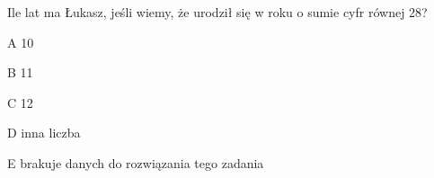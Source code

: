 \begin{tresc}
Ile lat ma Łukasz, jeśli wiemy, że urodził się w roku o sumie cyfr równej 28?
\end{tresc}
\begin{wariant}{A} 10 \end{wariant}
\begin{wariant}{B} 11 \end{wariant}
\begin{wariant}{C} 12 \end{wariant}
\begin{wariant}{D} inna liczba \end{wariant}
\begin{wariant}{E} brakuje danych do rozwiązania tego zadania \end{wariant}
